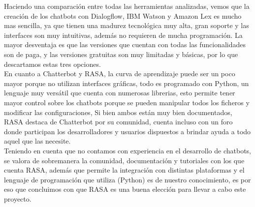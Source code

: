 \indent Haciendo una comparación entre todas las herramientas analizadas, vemos que la creación de los chatbots con Dialogflow, IBM Watson y Amazon Lex es mucho mas sencilla, ya que tienen una madurez tecnológica muy alta, gran soporte y las interfaces son muy intuitivas, además no requieren de mucha programación. La mayor desventaja es que las versiones que cuentan con todas las funcionalidades son de paga, y las versiones gratuitas son muy limitadas y básicas, por lo que descartamos estas tres opciones.\\
\indent En cuanto a Chatterbot y RASA, la curva de aprendizaje puede ser un poco mayor porque no utilizan interfaces gráficas, todo es programado con Python, un lenguaje muy versátil que cuenta con numerosas librerias, esto permite tener mayor control sobre los chatbots porque se pueden manipular todos los ficheros y modificar las configuraciones, Si bien ambos están muy bien documentados, RASA destaca de Chatterbot por su comunidad, cuenta incluso con un foro donde participan los desarrolladores y usuarios dispuestos a brindar ayuda a todo aquel que las necesite.\\
\indent Teniendo en cuenta que no contamos con experiencia en el desarrollo de chatbots, se valora de sobremanera la comunidad, documentación y tutoriales con los que cuenta RASA, además que permite la integración con distintas plataformas y el lenguaje de programación que utiliza (Python) es de nuestro conocimiento, es por eso que concluimos con que RASA es una buena elección para llevar a cabo este proyecto.


